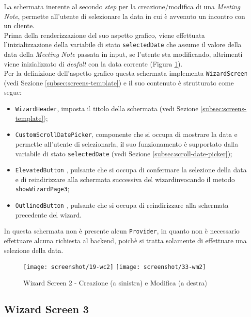 La schermata inerente al secondo \emph{step} per la creazione/modifica di una \emph{Meeting Note}, permette all'utente di selezionare la data in cui è avvenuto un incontro con un cliente. \\
Prima della renderizzazione del suo aspetto grafico, viene effettuata l'inizializzazione della variabile di stato \lstinline{selectedDate} che assume il valore della data della \emph{Meeting Note} passata in input, se l'utente sta modificando, altrimenti viene inizializzato di \emph{deafult} con la data corrente (Figura \ref{fig:w2}). \\
Per la definizione dell'aspetto grafico questa schermata implementa \lstinline{WizardScreen} (vedi Sezione \ref{subsec:screens-template}) e il suo contenuto è strutturato come segue:
\begin{itemize}
    \item \lstinline{WizardHeader}, imposta il titolo della schermata (vedi Sezione \ref{subsec:screens-template});
    \item \lstinline{CustomScrollDatePicker}, componente che si occupa di mostrare la data e permette all'utente di selezionarla, il suo funzionamento è supportato dalla variabile di stato \lstinline{selectedDate} (vedi Sezione \ref{subsec:scroll-date-picker});
    \item \lstinline{ElevatedButton} \cite{site:elevated-button}, pulsante che si occupa di confermare la selezione della data e di reindirizzare alla schermata successiva del \gls{wizard}\glsoccur invocando il metodo \lstinline{showWizardPage3};
    \item \lstinline{OutlinedButton} \cite{site:outline-button}, pulsante che si occupa di reindirizzare alla schermata precedente del \gls{wizard}\glsoccur.
\end{itemize}
In questa schermata non è presente alcun \lstinline{Provider}, in quanto non è necessario effettuare alcuna richiesta al \gls{backend}\glsoccur, poichè si tratta solamente di effettuare una selezione della data.

\begin{figure}[!h] 
    \centering 
    \texttt{[image: screenshot/19-wc2]}
    \hfill
    \texttt{[image: screenshot/33-wm2]} 
    \caption{Wizard Screen 2 - Creazione (a sinistra) e Modifica (a destra)}
    \label{fig:w2}
\end{figure}

\subsection{Wizard Screen 3}
\label{subsec:wizard-screen-3}

